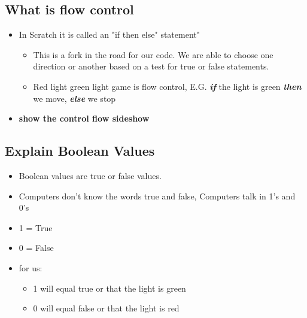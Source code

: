 \documentclass[12pt]{article}
\begin{document}
\subsection*{What is flow control}
	\begin{itemize}
		\item In Scratch it is called an "if then else" statement"
		\begin{itemize}
			\item This is a fork in the road for our code.  We are able to choose one direction or another based on a test for true or false statements.
			\item Red light green light game is flow control, E.G. \textbf{\textit{if}} the light is green \textbf{\textit{then}} we move, \textbf{\textit{else}} we stop
		\end{itemize}
		\item \textbf{show the control flow sideshow}
	\end{itemize}
	

\subsection*{Explain Boolean Values}
	\begin{itemize}
		\item Boolean values are true or false values. 
		\item Computers don't know the words true and false, Computers talk in 1’s and 0’s
		\item 1 = True
		\item 0 = False
		\item for us:
			\begin{itemize}
				\item 1 will equal true or that the light is green
				\item 0 will equal false or that the light is red
			\end{itemize}
	\end{itemize}
\end{document}
